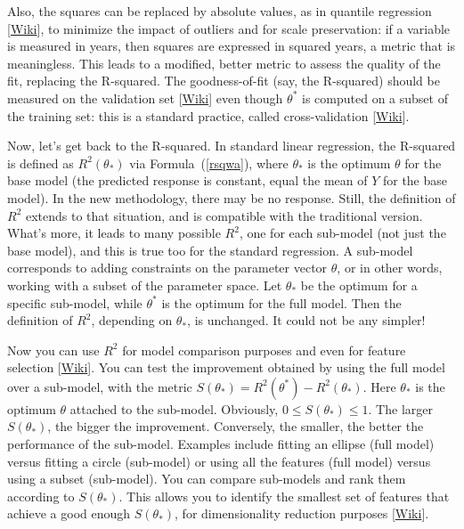 \documentclass[oneside,10pt]{book}
\begin{document}
Also, the squares
 can be replaced by absolute values, as in \textcolor{index}{quantile regression} [\href{https://en.wikipedia.org/wiki/Quantile_regression}{Wiki}], to minimize the impact of outliers and for scale preservation: if a variable is measured in years, then squares are expressed in squared years, a metric that is meaningless. This leads to a modified, better metric to assess the quality of the fit, replacing the R-squared.
The \textcolor{index}{goodness-of-fit} (say, the R-squared) should be measured on the \textcolor{index}{validation set}
 [\href{https://en.wikipedia.org/wiki/Training,_validation,_and_test_data_sets}{Wiki}] even though $\theta^*$ is computed on a subset of the \textcolor{index}{training set}: this is a standard practice, called \textcolor{index}{cross-validation} [\href{https://en.wikipedia.org/wiki/Cross-validation_(statistics)}{Wiki}].

Now, let's get back to the
\textcolor{index}{R-squared}. In standard linear regression, the R-squared is defined as $R^2(\theta_*)$ via
 Formula~(\ref{rsqwa}), where
 $\theta_*$ is the optimum $\theta$ for the base model (the predicted response is constant, equal the mean of $Y$ for the base model). In the
 new methodology, there may be no response. Still, the definition of $R^2$ extends to that situation, and is compatible with the traditional version.
 What's more, it leads to many possible $R^2$, one for each sub-model (not just the base model), and this is true too for the standard regression.
A sub-model corresponds to adding constraints on the parameter vector $\theta$, or in other words, working with a subset of the parameter space. Let $\theta_*$ be the optimum for a specific sub-model, while $\theta^*$ is the optimum for the full model. Then the definition of $R^2$, depending on $\theta_*$, is unchanged. It could not be any simpler!

Now you can use $R^2$ for model comparison purposes and even for \textcolor{index}{feature selection} [\href{https://en.wikipedia.org/wiki/Feature_selection}{Wiki}]. You can test the improvement obtained by using the full model over a sub-model,
 with the metric $S(\theta_*)= R^2(\theta^*)-R^2(\theta_*)$. Here $\theta_*$ is the optimum $\theta$ attached to the sub-model. Obviously, $0\leq S(\theta_*)\leq 1$. The larger $S(\theta_*)$, the bigger the improvement. Conversely, the smaller, the better the performance of the sub-model. Examples include fitting an ellipse (full model) versus fitting a circle (sub-model) or using all the features (full model) versus using a subset (sub-model).
You can compare sub-models and rank them according to $S(\theta_*)$. This allows you to identify the smallest set of features that achieve a good
 enough $S(\theta_*)$, for
\textcolor{index}{dimensionality reduction}
 purposes [\href{https://en.wikipedia.org/wiki/Dimensionality_reduction}{Wiki}].
\end{document}
